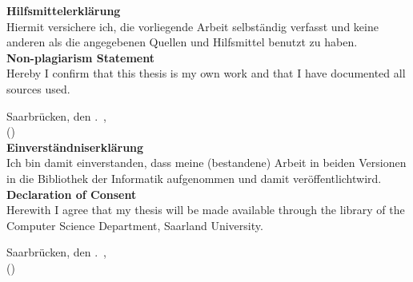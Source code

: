 \vspace*{1cm}
\textbf{\large Hilfsmittelerkl\"arung}\\[1em]
Hiermit versichere ich, die vorliegende Arbeit selbst\"andig verfasst und keine anderen als die angegebenen Quellen und Hilfsmittel benutzt zu haben.
\\[0.3cm]

\textbf{\large Non-plagiarism Statement}\\[1em]
Hereby I confirm that this thesis is my own work and that I have documented all sources used.

Saarbr\"ucken, den \number\day.\ \monthgerman \number\year,\\[1.5cm]
\hspace*{1cm}(\authornames)\\[2cm]

\textbf{\large Einverst\"andniserkl\"arung}\\[1em]
Ich bin damit einverstanden, dass meine (bestandene) Arbeit in beiden Versionen in die Bibliothek der Informatik aufgenommen und damit ver\"offentlichtwird.
\\[0.3cm]

\textbf{\large Declaration of Consent}\\[1em]
Herewith I agree that my thesis will be made available through the library of the Computer Science Department, Saarland University.

Saarbr\"ucken, den \number\day.\ \monthgerman \number\year,\\[1.5cm]
\hspace*{1cm}(\authornames)
\clearpage
